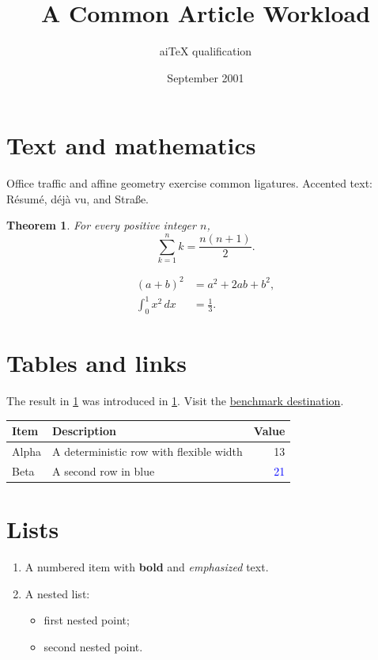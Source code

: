 \documentclass[11pt]{article}
\title{A Common Article Workload}
\author{aiTeX qualification}
\date{September 2001}
\newtheorem{theorem}{Theorem}[section]
\begin{document}
\maketitle
\tableofcontents

\section{Text and mathematics}\label{sec:text}
Office traffic and affine geometry exercise common ligatures. Accented text:
R\'esum\'e, d\'ej\`a vu, and Stra\ss e.

\begin{theorem}\label{thm:sum}
For every positive integer $n$,
\[
  \sum_{k=1}^{n} k = \frac{n(n+1)}{2}.
\]
\end{theorem}

\begin{align}
  (a+b)^2 &= a^2+2ab+b^2, \\
  \int_0^1 x^2\,dx &= \frac13.
\end{align}

\section{Tables and links}
The result in \cref{thm:sum} was introduced in \cref{sec:text}. Visit the
\href{https://example.invalid/aitex/matrix}{benchmark destination}.

\begin{tabularx}{\linewidth}{@{}l>{\raggedleft\arraybackslash}Xr@{}}
\toprule
Item & Description & Value \\
\midrule
Alpha & A deterministic row with flexible width & 13 \\
Beta & A second row in blue & \textcolor{blue}{21} \\
\bottomrule
\end{tabularx}

\section{Lists}
\begin{enumerate}
  \item A numbered item with \textbf{bold} and \emph{emphasized} text.
  \item A nested list:
    \begin{itemize}
      \item first nested point;
      \item second nested point.
    \end{itemize}
\end{enumerate}
\end{document}
